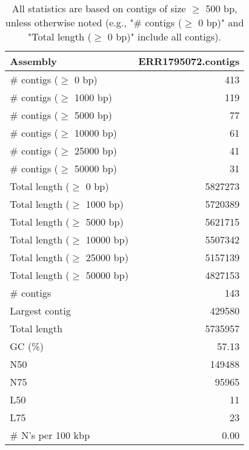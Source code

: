 \documentclass[12pt,a4paper]{article}
\begin{document}
\begin{table}[ht]
\begin{center}
\caption{All statistics are based on contigs of size $\geq$ 500 bp, unless otherwise noted (e.g., "\# contigs ($\geq$ 0 bp)" and "Total length ($\geq$ 0 bp)" include all contigs).}
\begin{tabular}{|l*{1}{|r}|}
\hline
Assembly & ERR1795072.contigs \\ \hline
\# contigs ($\geq$ 0 bp) & 413 \\ \hline
\# contigs ($\geq$ 1000 bp) & 119 \\ \hline
\# contigs ($\geq$ 5000 bp) & 77 \\ \hline
\# contigs ($\geq$ 10000 bp) & 61 \\ \hline
\# contigs ($\geq$ 25000 bp) & 41 \\ \hline
\# contigs ($\geq$ 50000 bp) & 31 \\ \hline
Total length ($\geq$ 0 bp) & 5827273 \\ \hline
Total length ($\geq$ 1000 bp) & 5720389 \\ \hline
Total length ($\geq$ 5000 bp) & 5621715 \\ \hline
Total length ($\geq$ 10000 bp) & 5507342 \\ \hline
Total length ($\geq$ 25000 bp) & 5157139 \\ \hline
Total length ($\geq$ 50000 bp) & 4827153 \\ \hline
\# contigs & 143 \\ \hline
Largest contig & 429580 \\ \hline
Total length & 5735957 \\ \hline
GC (\%) & 57.13 \\ \hline
N50 & 149488 \\ \hline
N75 & 95965 \\ \hline
L50 & 11 \\ \hline
L75 & 23 \\ \hline
\# N's per 100 kbp & 0.00 \\ \hline
\end{tabular}
\end{center}
\end{table}
\end{document}
